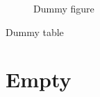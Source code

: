 \documentclass[twoside, titlepage]{article}
\begin{document}
\begin{figure}
  \caption{Dummy figure}
\end{figure}

\begin{table}
  \caption{Dummy table}
\end{table}

\newpage\thispagestyle{empty}

\section{Empty}
\newpage

\begin{appendix}
  \listoffigures
  \listoftables
\end{appendix}
\end{document}
